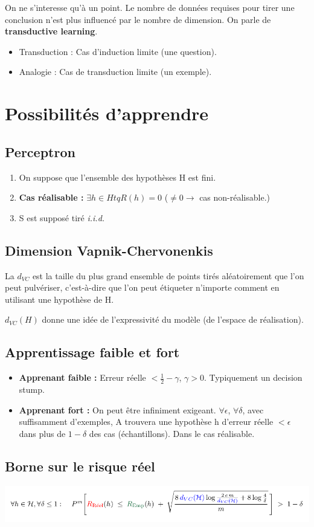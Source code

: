 \documentclass{article}
\begin{document}
On ne s'interesse qu'à un point. Le nombre de données requises pour tirer une conclusion n'est plus influencé par le nombre de dimension. On parle de \textbf{transductive learning}.
\begin{itemize}
\item Transduction : Cas d'induction limite (une question).
\item Analogie : Cas de transduction limite (un exemple).
\end{itemize}

\section{Possibilités d'apprendre}

\subsection{Perceptron}

\begin{enumerate}
\item On suppose que l'ensemble des hypothèses H est fini.
\item \textbf{Cas réalisable :} $ \exists h \in H tq R(h) = 0 $ ($ \ne 0 \rightarrow$ cas non-réalisable.)
\item S est supposé tiré \textit{i.i.d.}
\end{enumerate}


\subsection{Dimension Vapnik-Chervonenkis}

La $d_{VC}$ est la taille du plus grand ensemble de points tirés aléatoirement que l'on peut pulvériser, c'est-à-dire que l'on peut étiqueter n'importe comment en utilisant une hypothèse de H.

$d_{VC}(H)$ donne une idée de l'expressivité du modèle (de l'espace de réalisation).

\subsection{Apprentissage faible et fort}

\begin{itemize}
\item \textbf{Apprenant faible :} Erreur réelle $< \frac{1}{2} - \gamma$, $\gamma > 0$. Typiquement un decision stump.
\item \textbf{Apprenant fort :} On peut être infiniment exigeant. $\forall \epsilon$, $\forall \delta$, avec suffisamment d'exemples, A trouvera une hypothèse h d'erreur réelle $< \epsilon$ dans plus de $1 - \delta$ des cas (échantillons). Dans le cas réalisable.
\end{itemize}

\subsection{Borne sur le risque réel}

\includegraphics[scale=0.4]{risk_bound.png}
\end{document}
